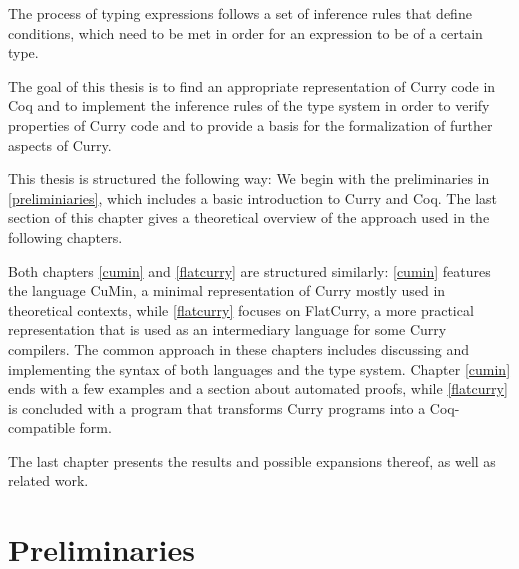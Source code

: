 \documentclass[paper = a4, fleqn, abstract=on, twoside]{scrreprt}
\begin{document}
The process of typing expressions follows a set of inference rules that define conditions, which need to be met in order for an expression to be of a certain type.\\
\par \noindent
The goal of this thesis is to find an appropriate representation of Curry code in Coq and to implement the inference rules of the type system in order to verify properties of Curry code and to provide a basis for the formalization of further aspects of Curry.\\
\par \noindent
This thesis is structured the following way: We begin with the preliminaries in \autoref{preliminiaries}, which includes a basic introduction to Curry and Coq. The last section of this chapter gives a theoretical overview of the approach used in the following chapters.\\
\par \noindent
Both chapters \ref{cumin} and \ref{flatcurry} are structured similarly: \autoref{cumin} features the language CuMin, a minimal representation of Curry mostly used in theoretical contexts, while \autoref{flatcurry} focuses on FlatCurry, a more practical representation that is used as an intermediary language for some Curry compilers.
The common approach in these chapters includes discussing and implementing the syntax of both languages and the type system. Chapter \ref{cumin} ends with a few examples and a section about automated proofs, while \autoref{flatcurry} is concluded with a program that transforms Curry programs into a Coq-compatible form.\\
\par \noindent
The last chapter presents the results and possible expansions thereof, as well as related work. 
\chapter{Preliminaries}
\label{preliminiaries}
\end{document}
